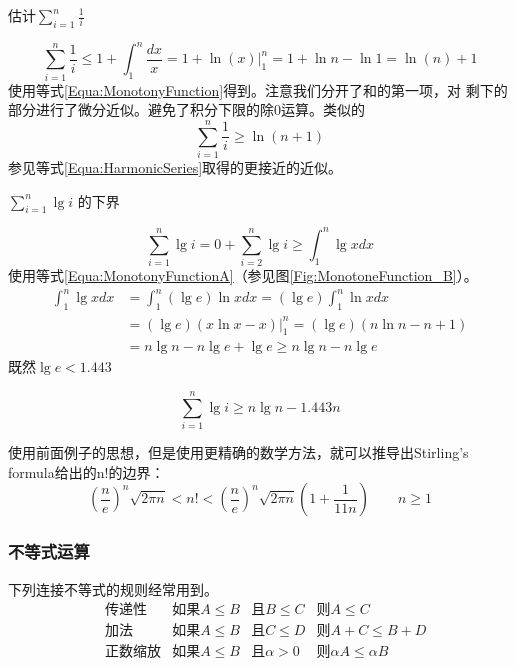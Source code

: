 \begin{example}
估计$\sum_{i=1}^n \frac{1}{i}$

\begin{displaymath}
    \sum_{i=1}^n \frac{1}{i} \leq 1+ \int_1^n \frac{dx}{x} =1 +
    \ln(x)|_1^n = 1+\ln n -\ln 1 =\ln(n) +1
\end{displaymath}
使用等式\ref{Equa:MonotonyFunction}得到。注意我们分开了和的第一项，对
剩下的部分进行了微分近似。避免了积分下限的除0运算。类似的
\begin{displaymath}
    \sum_{i=1}^n \frac{1}{i} \geq \ln(n+1)
\end{displaymath}
参见等式\ref{Equa:HarmonicSeries}取得的更接近的近似。
\end{example}

\begin{example}
$\sum_{i=1}^n \lg i$ 的下界

\begin{displaymath}
    \sum_{i=1}^n \lg i =0 + \sum_{i=2}^n \lg i \geq \int_1^n \lg xdx
\end{displaymath}
使用等式\ref{Equa:MonotonyFunctionA}（参见图\ref{Fig:MonotoneFunction_B}）。
\begin{displaymath}
    \begin{aligned}
        \int_1^n \lg xdx &=\int_1^n (\lg e)\ln xdx=(\lg e)\int_1^n \ln xdx\\
        &=(\lg e)(x\ln x -x)|_1^n=(\lg e)(n\ln n -n+1)\\
        &=n\lg n -n\lg e +\lg e \geq n \lg n -n\lg e
    \end{aligned}
\end{displaymath}
既然$\lg e < 1.443$

\begin{equation}\label{Equa:1_18}
    \sum_{i=1}^n \lg i \geq n\lg n -1.443n
\end{equation}
\end{example}

使用前面例子的思想，但是使用更精确的数学方法，就可以推导出Stirling's
formula给出的n!的边界：
\begin{equation}
    \left(\frac{n}{e}\right)^n\sqrt{2\pi n}<n!<\left(\frac{n}{e}\right)^n\sqrt{2\pi
    n}(1+ \frac{1}{11n}) \qquad n\geq 1
\end{equation}

\subsubsection{不等式运算}
下列连接不等式的规则经常用到。
\begin{equation}
    \begin{aligned}
        &\mbox{传递性}   &\mbox{如果} A\leq B &\mbox{且} B\leq C   &\mbox{则} A\leq C\\
        &\mbox{加法}     &\mbox{如果} A\leq B &\mbox{且} C\leq D   &\mbox{则} A+C\leq B+D\\
        &\mbox{正数缩放} &\mbox{如果} A\leq B &\mbox{且} \alpha >0 &\mbox{则} \alpha A\leq \alpha B
    \end{aligned}
\end{equation}

